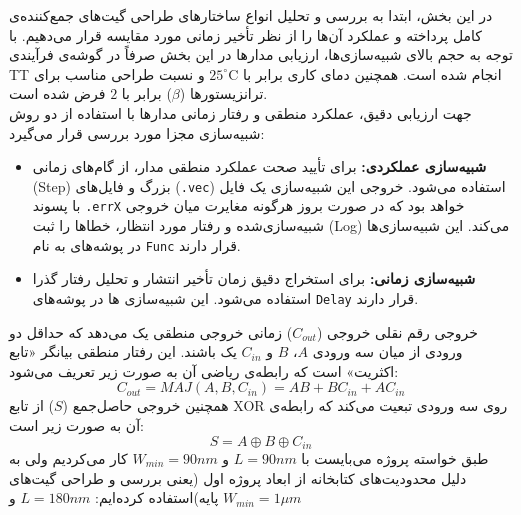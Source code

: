 \vspace{1cm}
در این بخش، ابتدا به بررسی و تحلیل انواع ساختارهای طراحی گیت‌های جمع‌کننده‌ی کامل
پرداخته و عملکرد آن‌ها را از نظر تأخیر زمانی مورد مقایسه قرار می‌دهیم.
با توجه به حجم بالای شبیه‌سازی‌ها، ارزیابی مدارها در این بخش صرفاً در گوشه‌ی فرآیندی
TT
انجام شده است. همچنین دمای کاری برابر با
$25^\circ\text{C}$
و نسبت طراحی مناسب برای ترانزیستورها
($\beta$)
برابر با
$2$
فرض شده است.
\\
جهت ارزیابی دقیق، عملکرد منطقی و رفتار زمانی مدارها با استفاده از دو روش شبیه‌سازی مجزا مورد بررسی قرار می‌گیرد:
\begin{itemize}
    \item \textbf{شبیه‌سازی عملکردی:} برای تأیید صحت عملکرد منطقی مدار، از گام‌های زمانی (Step) بزرگ و فایل‌های (\texttt{.vec}) استفاده می‌شود. خروجی این شبیه‌سازی یک فایل با پسوند \texttt{.errX} خواهد بود که در صورت بروز هرگونه مغایرت میان خروجی شبیه‌سازی‌شده و رفتار مورد انتظار، خطاها را ثبت (Log) می‌کند. این شبیه‌سازی‌ها در پوشه‌های به نام \texttt{Func} قرار دارند.
    \item \textbf{شبیه‌سازی زمانی:} برای استخراج دقیق زمان تأخیر انتشار و تحلیل رفتار گذرا استفاده می‌شود. این شبیه‌سازی ها در پوشه‌های \texttt{Delay} قرار دارند.
\end{itemize}
خروجی رقم نقلی خروجی
($C_{out}$)
زمانی خروجی منطقی یک می‌دهد که حداقل دو ورودی از میان سه ورودی
$A$،
$B$
و
$C_{in}$
یک باشند. این رفتار منطقی بیانگر «تابع اکثریت»
است که رابطه‌ی ریاضی آن به صورت زیر تعریف می‌شود:
$$C_{out} = MAJ(A, B, C_{in}) = A B + B C_{in} + A C_{in}$$
همچنین خروجی حاصل‌جمع
($S$)
از تابع
XOR
روی سه ورودی تبعیت می‌کند که رابطه‌ی آن به صورت زیر است:
$$S = A \oplus B \oplus C_{in}$$
\vspace{0.65cm}
\vspace{1cm}
طبق خواسته پروژه می‌بایست با $L=90nm$ و $W_{min}=90nm$ کار می‌کردیم ولی به دلیل محدودیت‌های کتابخانه از ابعاد پروژه اول (یعنی بررسی و طراحی گیت‌های پایه)استفاده کرده‌ایم: $L=180nm$ و $W_{min}=1\mu m$


\newpage




